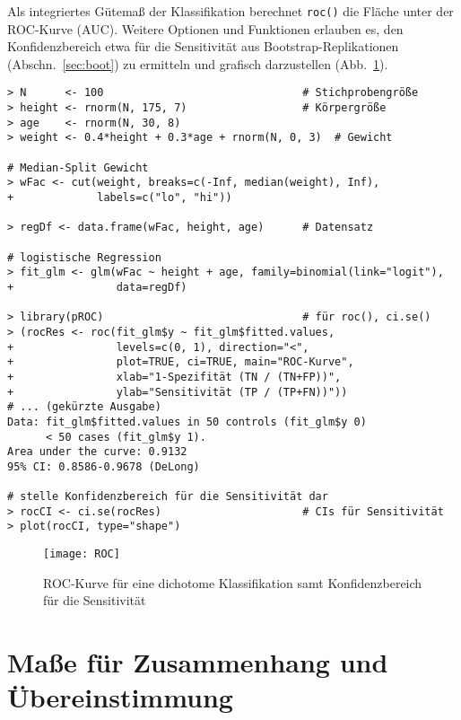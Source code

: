Als integriertes Gütemaß der Klassifikation berechnet \lstinline!roc()! die Fläche unter der ROC-Kurve (AUC). Weitere Optionen und Funktionen erlauben es, den Konfidenzbereich etwa für die Sensitivität aus Bootstrap-Replikationen (Abschn.\ \ref{sec:boot}) zu ermitteln und grafisch darzustellen (Abb.\ \ref{fig:ROC}).
\begin{lstlisting}
> N      <- 100                               # Stichprobengröße
> height <- rnorm(N, 175, 7)                  # Körpergröße
> age    <- rnorm(N, 30, 8)
> weight <- 0.4*height + 0.3*age + rnorm(N, 0, 3)  # Gewicht

# Median-Split Gewicht
> wFac <- cut(weight, breaks=c(-Inf, median(weight), Inf),
+             labels=c("lo", "hi"))

> regDf <- data.frame(wFac, height, age)      # Datensatz

# logistische Regression
> fit_glm <- glm(wFac ~ height + age, family=binomial(link="logit"),
+                data=regDf)

> library(pROC)                               # für roc(), ci.se()
> (rocRes <- roc(fit_glm$y ~ fit_glm$fitted.values,
+                levels=c(0, 1), direction="<",
+                plot=TRUE, ci=TRUE, main="ROC-Kurve",
+                xlab="1-Spezifität (TN / (TN+FP))",
+                ylab="Sensitivität (TP / (TP+FN))"))
# ... (gekürzte Ausgabe)
Data: fit_glm$fitted.values in 50 controls (fit_glm$y 0)
      < 50 cases (fit_glm$y 1).
Area under the curve: 0.9132
95% CI: 0.8586-0.9678 (DeLong)

# stelle Konfidenzbereich für die Sensitivität dar
> rocCI <- ci.se(rocRes)                      # CIs für Sensitivität
> plot(rocCI, type="shape")
\end{lstlisting}

\begin{figure}[ht]
\centering
\texttt{[image: ROC]}
\vspace*{-0.5em}
\caption{ROC-Kurve für eine dichotome Klassifikation samt Konfidenzbereich für die Sensitivität}
\label{fig:ROC}
\end{figure}

\section{Maße für Zusammenhang und Übereinstimmung}

